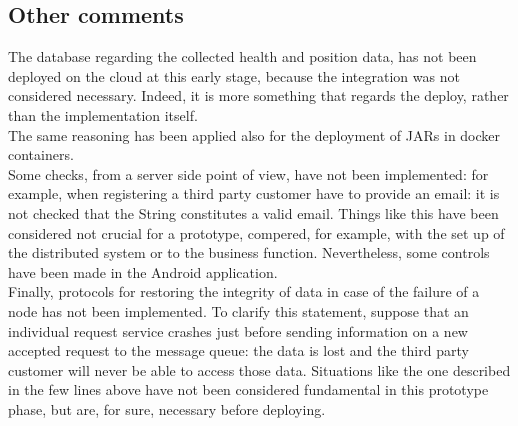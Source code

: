 \subsection{Other comments}
The database regarding the collected health and position data, has not been deployed on the cloud at this
early stage, because the integration was not considered necessary. Indeed, it is more something that regards the deploy, rather than the 
implementation itself. \\
The same reasoning has been applied also for the deployment of JARs in docker containers. \\
Some checks, from a server side point of view, have not been implemented: for example, when registering a third party customer have to
provide an email: it is not checked that the String constitutes a valid email. Things like this have been considered not crucial 
for a prototype, compered, for example, with the set up of the distributed system or to the business function.
Nevertheless, some controls have been made in the Android application. \\
Finally, protocols for restoring the integrity of data in case of the failure of a node has not been implemented. 
To clarify this statement, suppose that an individual request service crashes just before sending information on a new accepted request 
to the message queue: the data is lost and the third party customer will never be able to access those data. Situations like the one described
in the few lines above have not been considered fundamental in this prototype phase, but are, for sure, necessary before deploying. 